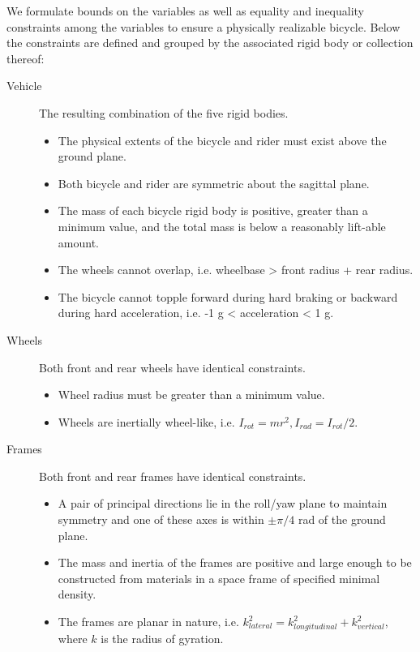 \documentclass{bmd2019a}
\begin{document}
We formulate bounds on the variables as well as equality and inequality
constraints among the variables to ensure a physically realizable bicycle.
Below the constraints are defined and grouped by the associated rigid body or
collection thereof:
%
\begin{description}

  \item[Vehicle] The resulting combination of the five rigid bodies.
    \begin{itemize}
      \itemsep0em
      \item The physical extents of the bicycle and rider must exist above the
        ground plane.
      \item Both bicycle and rider are symmetric about the sagittal
        plane.
      \item The mass of each bicycle rigid body is positive, greater than a
        minimum value, and the total mass is below a reasonably lift-able
        amount.
      \item The wheels cannot overlap, i.e. wheelbase > front radius + rear
        radius.
      \item The bicycle cannot topple forward during hard braking or backward
        during hard acceleration, i.e. -1 g < acceleration < 1 g.
    \end{itemize}

  \item[Wheels] Both front and rear wheels have identical constraints.
    \begin{itemize}
      \itemsep0em
      \item Wheel radius must be greater than a minimum value.
      \item Wheels are inertially wheel-like, i.e.  $I_{rot}=mr^2,
        I_{rad}=I_{rot}/2$.
    \end{itemize}

  \item[Frames] Both front and rear frames have identical constraints.
    \begin{itemize}
      \itemsep0em
      \item A pair of principal directions lie in the roll/yaw
        plane to maintain symmetry and one of these axes is within $\pm \pi/4$
        rad of the ground plane.
      \item The mass and inertia of the frames are positive and large enough to
        be constructed from materials in a space frame of specified minimal
        density.
      \item The frames are planar in nature, i.e.
        $k_{lateral}^2=k_{longitudinal}^2+k_{vertical}^2$, where $k$ is the
        radius of gyration.
    \end{itemize}


\end{description}
\end{document}
